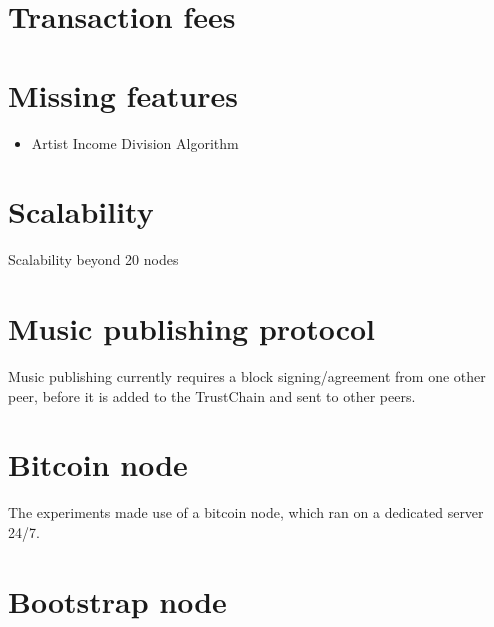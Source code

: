 \section{Transaction fees}

\section{Missing features}
\begin{itemize}
    \item Artist Income Division Algorithm
\end{itemize}
\section{Scalability}
Scalability beyond 20 nodes
\section{Music publishing protocol}
Music publishing currently requires a block signing/agreement from one other peer, before it is added to the TrustChain and sent to other peers.  
\section{Bitcoin node}
The experiments made use of a bitcoin node, which ran on a dedicated server 24/7.
\section{Bootstrap node}